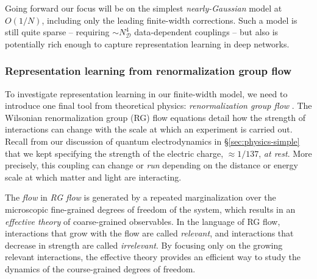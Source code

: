 \documentclass[12pt]{article}
\begin{document}
Going forward our focus will be on the simplest \emph{nearly-Gaussian} model at $O(1/N)$,  including only the leading finite-width corrections. Such a model is still quite sparse -- requiring $\sim N_{\mathcal{D}}^4$ data-dependent couplings -- but also is potentially  rich enough to capture representation learning in deep networks.





























\subsubsection*{Representation learning from renormalization group flow}\label{sec:rg}

To investigate representation learning in our finite-width model, we need to introduce one final tool from theoretical physics: \emph{renormalization group flow} \cite{PhysRevB.4.3174,PhysRevB.4.3184}. The Wilsonian renormalization group (RG) flow equations detail how the strength of interactions can change with the scale at which an experiment is carried out. Recall from our discussion of quantum electrodynamics in \S\ref{sec:physics-simple} that we kept specifying the strength of the electric charge, $\approx 1/137$,  \emph{at rest}. More precisely, this coupling can change or \emph{run} depending on the distance or energy scale at which matter and light are interacting.




The \emph{flow} in \emph{RG flow} is generated by a repeated marginalization over the microscopic fine-grained degrees of freedom of the system, which results in an \emph{effective theory} of coarse-grained observables.
In the language of RG flow, interactions that grow with the flow are called \emph{relevant}, and interactions that decrease in strength are called \emph{irrelevant}.
By focusing only on the growing relevant interactions, the effective theory provides an efficient way to study the dynamics of the course-grained degrees of freedom.
\end{document}
